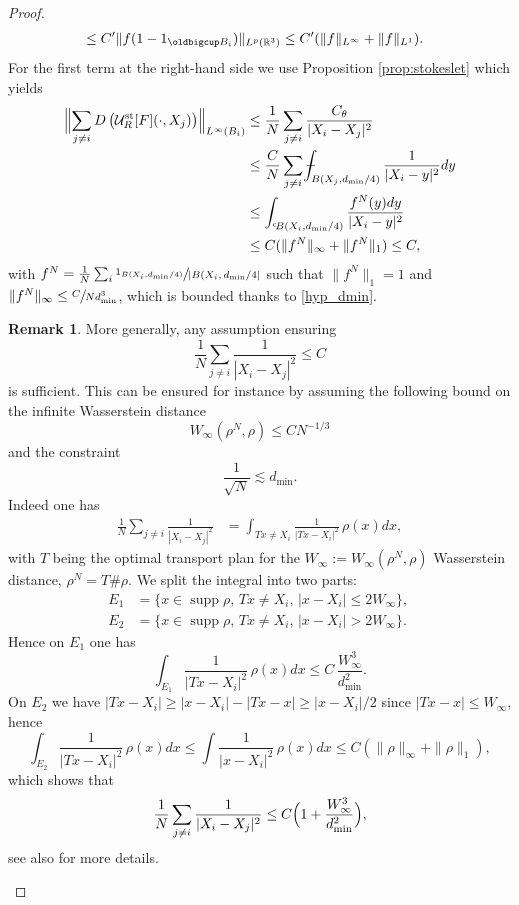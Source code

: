 \documentclass[JEP,XML,SOM,Unicode,NoEqCountersInSection,published]{cedram}
\newcommand{\st}{\mathrm{st}}
\def\Xint#1{\mathchoice
{\XXint\displaystyle\textstyle{#1}}%
{\XXint\textstyle\scriptstyle{#1}}%
{\XXint\scriptstyle\scriptscriptstyle{#1}}%
{\XXint\scriptscriptstyle\scriptscriptstyle{#1}}%
\!\int}
\def\XXint#1#2#3{{\setbox0=\hbox{$#1{#2#3}{\int}$ }
\vcenter{\hbox{$#2#3$ }}\kern-.6\wd0}}
\def\dashint{\Xint-}
\theoremstyle{plain}
\theoremstyle{definition}
\newtheorem{rem}{Remark}[section]
\newcommand{\supp}{\operatorname{supp}}
\newcommand{\R}{\mathbb{R}}
\begin{document}
\begin{proof}
\begin{align*}
&\le C' \|f (1-1_{\oldbigcup B_i})\|_{L^p(\R^3)} \le C' (\|f\|_{L^\infty} + \|f\|_{L^1}).
\end{align*}
For the first term at the right-hand side we use Proposition \ref{prop:stokeslet} which yields
\begin{align*}
\Bigl\| \sum_{j \neq i} D\left(\mathcal{U}^{\st}_R[F] (\cdot,X_j)\right) \Bigr\|_{L^\infty(B_i)}& \leq \frac{1}{N} \sum_{j \neq i} \frac{C_\theta }{|X_i-X_j|^2} \\
& \leq \frac{C}{N}\sum_{j \neq i}\dashint_{B(X_j,d_{\min}/4)} \frac{1}{|X_i-y|^2}dy \\
&\leq \int_{{}^\mathrm{c}\! B(X_i,d_{\min}/4)} \frac{f^N(y)dy}{|X_i-y|^2}\\
&\leq C(\|f^N\|_\infty+\|f^N\|_1)\leq C,
\end{align*}
with $f^N=\frac{1}{N} \sum_i \sfrac{1_{B(X_i,d_{\min}/4)}}{|B(X_i,d_{\min}/4|}$ such that $\|f^N\|_1=1$ and $\|f^N\|_\infty \leq \sfrac{C}{N d_{\min}^3}$, which is bounded thanks to \eqref{hyp_dmin}.
\begin{rem}\label{discussion_d_min}
More generally, any assumption ensuring
\[
\frac{1}{N} \sum_{j \neq i} \frac{1 }{|X_i-X_j|^2} \leq C
\]
is sufficient. This can be ensured for instance by assuming the following bound on the infinite Wasserstein distance
\[
W_\infty(\rho^N,\rho) \leq CN^{-1/3}
\]
and the constraint
\[
\frac{1}{\sqrt{N}} \lesssim d_{\min}.
\]
Indeed one has
\begin{align*}
\frac{1}{N}\sum_{j \neq i} \frac{1}{|X_i-X_j|^2}&= \int_{Tx\neq X_i}\frac{1}{|Tx-X_i|^2} \,\rho(x) dx,
\end{align*}
with $T$ being the optimal transport plan for the $W_\infty:=W_\infty(\rho^N,\rho)$ Wasserstein distance, $\rho^N=T\# \rho$. We split the integral into two parts:
\begin{align*}
E_1&=\{ x \in \supp \rho,\, Tx \neq X_i,\, |x-X_i| \leq 2W_\infty\},\,
\\
E_2 &= \{ x \in \supp \rho,\, Tx \neq X_i,\, |x-X_i|>2W_\infty\}.
\end{align*}
Hence on $E_1$ one has
\[
\int_{E_1}\frac{1}{|Tx-X_i|^2}\, \rho(x) dx \leq C\,\frac{W_\infty^3}{d_{\min}^2}.
\]
On $E_2$ we have $|Tx-X_i|\geq |x-X_i|-|Tx-x|\geq |x-X_i|/2 $ since $ |Tx-x| \leq W_\infty$, hence
\[
\int_{E_2}\frac{1}{|Tx-X_i|^2}\, \rho(x) dx \leq \int \frac{1}{|x-X_i|^2}\, \rho(x) dx \leq C(\|\rho\|_\infty+\|\rho\|_1),
\]
which shows that
\[
\frac{1}{N}\sum_{j \neq i} \frac{1}{|X_i-X_j|^2} \leq C\Bigl(1+\frac{W_\infty^3}{d_{\min}^2}\Bigr),
\]
see also \cite[Lem.\,2.3]{HoferSchubert23} for more details.\qedhere
\end{rem}
\end{proof}
\end{document}
